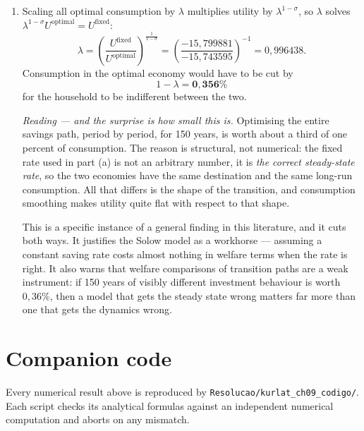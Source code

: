 \documentclass[12pt, letterpaper]{article}
\begin{document}
\begin{tcolorbox}[evenbox,title={Problem 9.12 \quad Optimal vs Fixed Savings Rates}]
\begin{enumerate}
\item Scaling all optimal consumption by $\lambda$ multiplies utility by $\lambda^{1-\sigma}$,
so $\lambda$ solves $\lambda^{1-\sigma}U^{\text{optimal}}=U^{\text{fixed}}$:
\[
\lambda=\left(\frac{U^{\text{fixed}}}{U^{\text{optimal}}}\right)^{\frac{1}{1-\sigma}}
=\left(\frac{-15{,}799881}{-15{,}743595}\right)^{-1}
=\boxed{0{,}996438}.
\]
Consumption in the optimal economy would have to be cut by
\[
1-\lambda=\mathbf{0{,}356\%}
\]
for the household to be indifferent between the two.

\smallskip
\emph{Reading --- and the surprise is how small this is.} Optimising the entire savings path,
period by period, for 150 years, is worth about a third of one percent of consumption. The reason
is structural, not numerical: the fixed rate used in part (a) is not an arbitrary number, it is
\emph{the correct steady-state rate}, so the two economies have the same destination and the same
long-run consumption. All that differs is the shape of the transition, and consumption smoothing
makes utility quite flat with respect to that shape.

\smallskip
This is a specific instance of a general finding in this literature, and it cuts both ways. It
justifies the Solow model as a workhorse --- assuming a constant saving rate costs almost nothing
in welfare terms when the rate is right. It also warns that welfare comparisons of transition
paths are a weak instrument: if 150 years of visibly different investment behaviour is worth
$0{,}36\%$, then a model that gets the steady state wrong matters far more than one that gets the
dynamics wrong.
\end{enumerate}
\end{tcolorbox}

\section*{Companion code}

Every numerical result above is reproduced by \texttt{Resolucao/kurlat\_ch09\_codigo/}. Each
script checks its analytical formulas against an independent numerical computation and aborts on
any mismatch.
\end{document}
